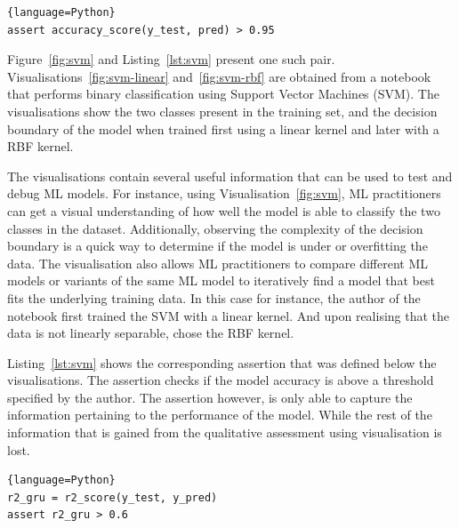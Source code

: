 \documentclass[conference]{IEEEtran}
\begin{document}
\begin{lstlisting}[caption={Assertion on the accuracy of the ML model.}, label={lst:svm}]{language=Python}
assert accuracy_score(y_test, pred) > 0.95
\end{lstlisting}

Figure~\ref{fig:svm} and Listing~\ref{lst:svm} present one such pair. Visualisations~\ref{fig:svm-linear} and~\ref{fig:svm-rbf} are obtained from a notebook that performs binary classification using Support Vector Machines (SVM). The visualisations show the two classes present in the training set, and the decision boundary of the model when trained first using a linear kernel and later with a RBF kernel.

The visualisations contain several useful information that can be used to test and debug ML models. For instance, using Visualisation~\ref{fig:svm}, ML practitioners can get a visual understanding of how well the model is able to classify the two classes in the dataset. Additionally, observing the complexity of the decision boundary is a quick way to determine if the model is under or overfitting the data. The visualisation also allows ML practitioners to compare different ML models or variants of the same ML model to iteratively find a model that best fits the underlying training data. In this case for instance, the author of the notebook first trained the SVM with a linear kernel. And upon realising that the data is not linearly separable, chose the RBF kernel.

Listing~\ref{lst:svm} shows the corresponding assertion that was defined below the visualisations. The assertion checks if the model accuracy is above a threshold specified by the author. The assertion however, is only able to capture the information pertaining to the performance of the model. While the rest of the information that is gained from the qualitative assessment using visualisation is lost.

\begin{lstlisting}[caption={Assertion to check that the Coefficient of Determination ($R^2$) is higher than the specified threshold.}, label={lst:r2}]{language=Python}
r2_gru = r2_score(y_test, y_pred)
assert r2_gru > 0.6
\end{lstlisting}
\end{document}
